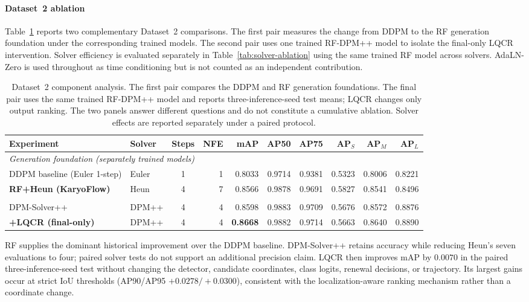 \documentclass[journal,10pt]{IEEEtran}
\theoremstyle{definition}
\begin{document}
\paragraph{Dataset~2 ablation}
Table~\ref{tab:main-ablation} reports two complementary Dataset~2 comparisons.
The first pair measures the change from DDPM to the RF generation foundation
under the corresponding trained models. The second pair uses one trained
RF-DPM++ model to isolate the final-only LQCR intervention. Solver efficiency
is evaluated separately in Table~\ref{tab:solver-ablation} using the same
trained RF model across solvers.
AdaLN-Zero is used throughout as time conditioning but is not counted as an
independent contribution.

\begin{table}[t]
  \centering
  \small
  \caption{Dataset~2 component analysis. The first pair compares the DDPM and
  RF generation foundations. The final pair uses the same trained RF-DPM++
  model and reports three-inference-seed test means; LQCR changes only output
  ranking. The two panels answer different questions and do not constitute a
  cumulative ablation. Solver effects are reported separately under a paired
  protocol.}
  \label{tab:main-ablation}
  \begin{tabular}{llcrrrrrrr}
    \toprule
    Experiment & Solver & Steps & NFE & mAP & AP50 & AP75 & AP$_S$ & AP$_M$ & AP$_L$ \\
    \midrule
    \multicolumn{10}{l}{\textit{Generation foundation (separately trained models)}} \\
    DDPM baseline (Euler 1-step)  & Euler   & 1 & 1 & 0.8033 & 0.9714 & 0.9381 & 0.5323 & 0.8006 & 0.8221 \\
    \textbf{RF+Heun (KaryoFlow)} & Heun    & 4 & 7 & 0.8566 & 0.9878 & 0.9691 & 0.5827 & 0.8541 & 0.8496 \\
    \addlinespace[2pt]
    \multicolumn{10}{l}{\textit{Final-stage decision (one fixed detector)}} \\
    DPM-Solver++ & DPM++ & 4 & 4 & 0.8598 & 0.9883 & 0.9709 & 0.5676 & 0.8572 & 0.8876 \\
    \textbf{+LQCR (final-only)} & DPM++ & 4 & 4 & \textbf{0.8668} & 0.9882 & 0.9714 & 0.5663 & 0.8640 & 0.8890 \\
    \bottomrule
  \end{tabular}
\end{table}

RF supplies the dominant historical improvement over the DDPM baseline.
DPM-Solver++ retains accuracy while reducing Heun's seven evaluations to
four; paired solver tests do not support an additional precision
claim. LQCR then improves mAP by $0.0070$ in the paired three-inference-seed test
without changing the detector,
candidate coordinates, class logits, renewal decisions, or trajectory. Its largest gains occur at
strict IoU thresholds (AP90/AP95 $+0.0278/+0.0300$), consistent with the
localization-aware ranking mechanism rather than a coordinate change.
\end{document}
